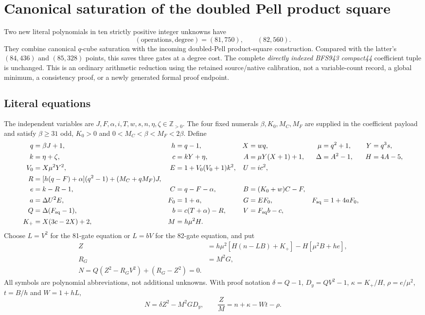 \section{Canonical saturation of the doubled Pell product square}
\label{sec:positive81}
Two new literal polynomials in ten strictly positive integer unknowns have
\[
 (\text{operations},\text{degree})=(81,750),\qquad(82,560).
\]
They combine canonical $q$-cube saturation with the incoming doubled-Pell
product-square construction. Compared with the latter's $(84,436)$ and
$(85,328)$ points, this saves three gates at a degree cost. The complete
\emph{directly indexed BFS943 compact44} coefficient tuple is unchanged.
This is an ordinary arithmetic reduction using the retained source/native
calibration, not a variable-count record, a global minimum, a consistency
proof, or a newly generated formal proof endpoint.

\subsection{Literal equations}
The independent variables are
$J,F,\alpha,i,T,w,s,n,\eta,\zeta\in\mathbb Z_{>0}$.
The four fixed numerals $\beta,K_0,M_C,M_F$ are supplied in the coefficient
payload and satisfy $\beta\ge31$ odd, $K_0>0$ and
$0<M_C<\beta<M_F<2\beta$. Define
\begin{align*}
q&=\beta J+1,& h&=q-1,& X&=wq,& \mu&=q^2+1,&Y&=q^3s,\\
k&=\eta+\zeta,&c&=kY+\eta,&A&=\mu Y(X+1)+1,&\Delta&=A^2-1,&H&=4A-5,\\
V_0&=X\mu^2Y^2,&E&=1+V_0(V_0+1)k^2,&U&=ic^2,\\
R&=[h(q-F)+\alpha](q^2-1)+(M_C+qM_F)J,\\
e&=k-R-1,&C&=q-F-\alpha,&B&=(K_0+w)C-F,\\
a&=\Delta U^2E,&F_0&=1+a,&G&=EF_0,&F_{\rm sq}&=1+4aF_0,\\
Q&=\Delta(F_{\rm sq}-1),&b&=c(T+\alpha)-R,&V&=F_{\rm sq}b-c,\\
K_+&=X(3c-2X)+2,&M&=h\mu^2H.
\end{align*}
Choose $L=V^2$ for the 81-gate equation or $L=bV$ for the 82-gate equation,
and put
\begin{align*}
 Z&=h\mu^2[H(n-LB)+K_+]-H[\mu^2B+he],\\
 R_G&=M^2G,\\
 \boxed{N=Q(Z^2-R_GV^2)+(R_G-Z^2)=0.}
\end{align*}
All symbols are polynomial abbreviations, not additional unknowns.
With proof notation $\delta=Q-1$, $D_y=QV^2-1$,
$\kappa=K_+/H$, $\rho=e/\mu^2$, $t=B/h$ and $W=1+hL$,
\begin{equation}
 N=\delta Z^2-M^2GD_y,
 \qquad \frac ZM=n+\kappa-Wt-\rho.
 \label{eq:positive81-carrier}
\end{equation}

